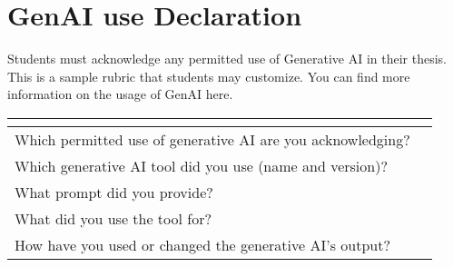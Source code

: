 \documentclass[]{document-classes/mscthesis}
\affiliation{
  \institution{\thesisinstitution}
  \city{\thesiscity}
  \country{\thesiscountry}
}
\begin{document}
\section*{GenAI use Declaration}


Students must acknowledge any permitted use of Generative AI in their thesis. This is a sample rubric that students may customize. You can find more information on the usage of GenAI here. 

\begin{table}[h]
\centering
\begin{tabular}{|p{}|p{}|}
\hline
\textbf{} & \textbf{} \\
\hline
Which permitted use of generative AI are you acknowledging?	 &  \\
\hline
Which generative AI tool did you use (name and version)?	 &  \\
\hline
What prompt did you provide? &  \\
\hline
What did you use the tool for? &  \\
\hline
How have you used or changed the generative AI’s output? &  \\
\hline
\end{tabular}
\end{table}
\end{document}
